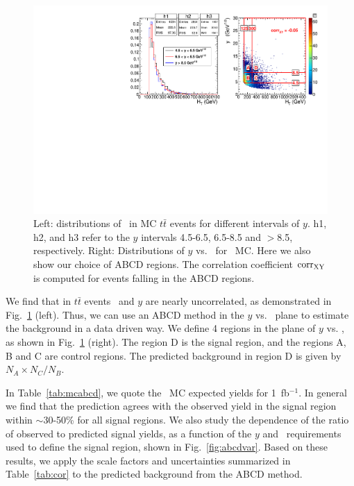 \begin{figure}[hbt]
\begin{center}
\includegraphics[width=1\linewidth]{plots/abcd_tt.pdf}
\caption{\label{fig:uncor}\protect 
Left: distributions of \Ht\ 
in MC $t\bar{t}$ events for different intervals of $y$. 
h1, h2, and h3 refer to the $y$ intervals 4.5-6.5, 6.5-8.5 and $>$8.5, respectively. Right: 
Distributions of $y$ vs. 
\Ht\ for \ttbar\ MC.  Here we also show our choice of ABCD regions. The correlation coefficient
${\rm corr_{XY}}$ is computed for events falling in the ABCD regions.
}
\end{center}
\end{figure}

We find that in $t\bar{t}$ events \Ht\ and 
$y$ are nearly uncorrelated, 
as demonstrated in Fig.~\ref{fig:uncor} (left).
Thus, we can use an ABCD method in the $y$ vs. \Ht\
plane to estimate the background in a data driven way. We define 4 regions in the 
plane of $y$ vs. \Ht, as shown in Fig.~\ref{fig:uncor} (right).
The region D is the signal region, and the regions A, B and C are control regions.
The predicted background in region D is given by $N_A \times N_C / N_B$.

In Table~\ref{tab:mcabcd}, we quote the \ttbar\ MC expected yields for 1~fb$^{-1}$. In
general we find that the prediction agrees with the observed yield in the signal region within
$\sim$30-50\% for all signal regions. We also study the dependence of the ratio
of observed to predicted signal yields, as a function of the $y$ and \Ht\
requirements used to define the signal region, shown in Fig.~\ref{fig:abcdvar}.
Based on these results, we apply the
scale factors and uncertainties summarized in Table~\ref{tab:cor} to the
predicted background from the ABCD method.


